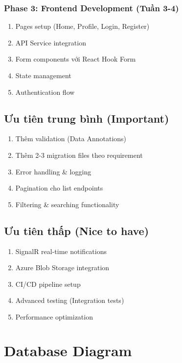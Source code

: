 \documentclass[12pt,a4paper]{report}
\begin{document}
\subsection{Phase 3: Frontend Development (Tuần 3-4)}
\begin{enumerate}
    \item Pages setup (Home, Profile, Login, Register)
    \item API Service integration
    \item Form components với React Hook Form
    \item State management
    \item Authentication flow
\end{enumerate}

\section{Ưu tiên trung bình (Important)}

\begin{enumerate}
    \item Thêm validation (Data Annotations)
    \item Thêm 2-3 migration files theo requirement
    \item Error handling \& logging
    \item Pagination cho list endpoints
    \item Filtering \& searching functionality
\end{enumerate}

\section{Ưu tiên thấp (Nice to have)}

\begin{enumerate}
    \item SignalR real-time notifications
    \item Azure Blob Storage integration
    \item CI/CD pipeline setup
    \item Advanced testing (Integration tests)
    \item Performance optimization
\end{enumerate}

\newpage

\chapter{Database Diagram}
\end{document}
